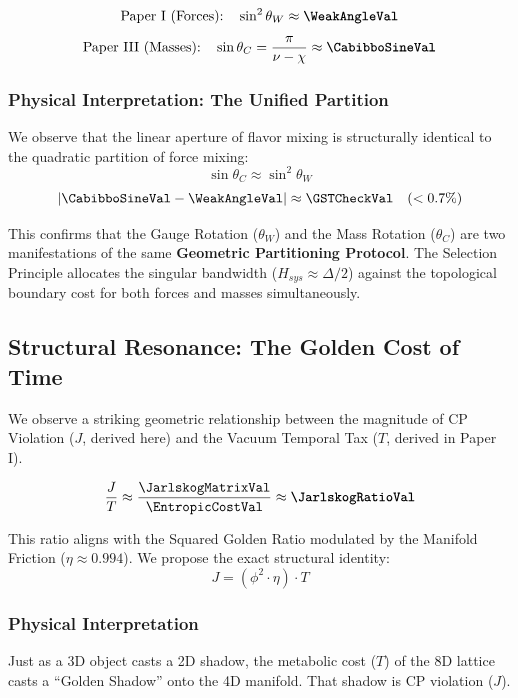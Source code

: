 \begin{equation}
\text{Paper I (Forces):} \quad \sin^2 \theta_W \approx \textbf{\WeakAngleVal}
\end{equation}
\begin{equation}
\text{Paper III (Masses):} \quad \sin \theta_C = \frac{\pi}{\nu - \chi} \approx \textbf{\CabibboSineVal}
\end{equation}

\subsubsection{Physical Interpretation: The Unified Partition}
We observe that the linear aperture of flavor mixing is structurally identical to the quadratic partition of force mixing:
\begin{equation}
\sin \theta_C \approx \sin^2 \theta_W
\end{equation}
\begin{equation}
|\CabibboSineVal - \WeakAngleVal| \approx \GSTCheckVal \quad (< 0.7\%)
\end{equation}

This confirms that the Gauge Rotation ($\theta_W$) and the Mass Rotation ($\theta_C$) are two manifestations of the same \textbf{Geometric Partitioning Protocol}. The Selection Principle allocates the singular bandwidth ($H_{sys} \approx \Delta/2$) against the topological boundary cost for both forces and masses simultaneously.


\subsection{Structural Resonance: The Golden Cost of Time}
We observe a striking geometric relationship between the magnitude of CP Violation ($J$, derived here) and the Vacuum Temporal Tax ($T$, derived in Paper I).

\begin{equation}
\frac{J}{T} \approx \frac{\JarlskogMatrixVal}{\EntropicCostVal} \approx \textbf{\JarlskogRatioVal}
\end{equation}

This ratio aligns with the Squared Golden Ratio modulated by the Manifold Friction ($\eta \approx 0.994$). We propose the exact structural identity:
\begin{equation}
J = (\phi^2 \cdot \eta) \cdot T
\end{equation}

\subsubsection{Physical Interpretation}
Just as a 3D object casts a 2D shadow, the metabolic cost ($T$) of the 8D lattice casts a ``Golden Shadow'' onto the 4D manifold. That shadow is CP violation ($J$).





